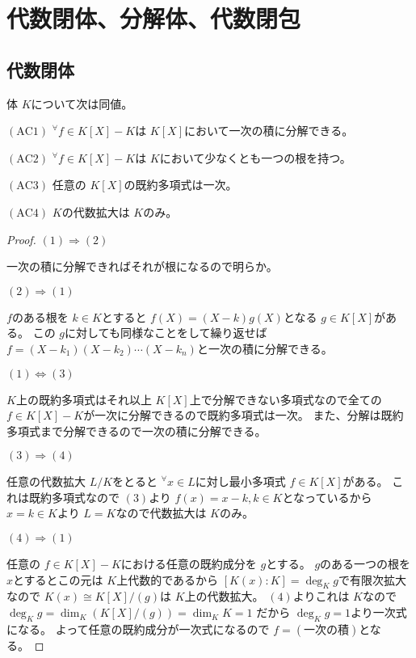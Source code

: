 \documentclass[../master_galois_theory]{subfiles}
\begin{document}
\setcounter{section}{6}

\section{代数閉体、分解体、代数閉包}

\subsection{代数閉体}

\begin{prop} \label{prop7.1}
  体 $K$について次は同値。

  $(\mathrm{AC}1)$
    ${}^\forall f \in K[X] - K$は $K[X]$において一次の積に分解できる。

  $(\mathrm{AC}2)$
    ${}^\forall f \in K[X] - K$は $K$において少なくとも一つの根を持つ。

  $(\mathrm{AC}3)$
    任意の $K[X]$の既約多項式は一次。

  $(\mathrm{AC}4)$
    $K$の代数拡大は $K$のみ。
\end{prop}

\begin{proof}

  $(1) \Rightarrow (2)$

  一次の積に分解できればそれが根になるので明らか。

  $(2) \Rightarrow (1)$

  $f$のある根を $k \in K$とすると $f(X) = (X - k)g(X)$となる $g \in K[X]$がある。
  この $g$に対しても同様なことをして繰り返せば
  $f = (X - k_1)(X - k_2) \cdots (X - k_n)$と一次の積に分解できる。

  $(1) \Leftrightarrow (3)$

  $K$上の既約多項式はそれ以上 $K[X]$上で分解できない多項式なので全ての $f \in K[X] - K$が一次に分解できるので既約多項式は一次。
  また、分解は既約多項式まで分解できるので一次の積に分解できる。

  $(3) \Rightarrow (4)$

  任意の代数拡大 $L/K$をとると
  ${}^\forall x \in L$に対し最小多項式 $f \in K[X]$がある。
  これは既約多項式なので $(3)$より $f(x) = x - k , k \in K$となっているから
  $x = k \in K$より $L = K$なので代数拡大は $K$のみ。

  $(4) \Rightarrow (1)$

  任意の $f \in K[X] - K$における任意の既約成分を $g$とする。
  $g$のある一つの根を $x$とするとこの元は $K$上代数的であるから
  $[K(x):K] = \deg_K g$で有限次拡大なので
  $K(x) \cong K[X]/(g)$は $K$上の代数拡大。
  $(4)$よりこれは $K$なので $\deg_K g = \dim_K (K[X]/(g)) = \dim_K K = 1$
  だから $\deg_K g = 1$より一次式になる。
  よって任意の既約成分が一次式になるので $f = (一次の積)$となる。
\end{proof}
\end{document}
